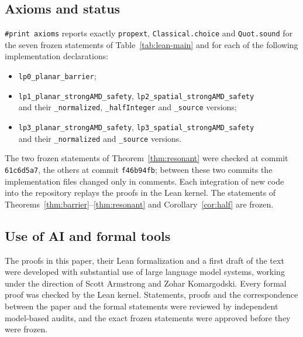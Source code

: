 \subsection{Axioms and status}

\texttt{\#print axioms} reports exactly \texttt{propext}, \texttt{Classical.choice} and \texttt{Quot.sound} for
the seven frozen statements of Table~\ref{tab:lean-main} and for each of the following implementation
declarations:
\begin{itemize}
\item \texttt{lp0\_planar\_barrier};
\item \texttt{lp1\_planar\_strongAMD\_safety}, \texttt{lp2\_spatial\_strongAMD\_safety}\\ and their
  \texttt{\_normalized}, \texttt{\_halfInteger} and \texttt{\_source} versions;
\item \texttt{lp3\_planar\_strongAMD\_safety}, \texttt{lp3\_spatial\_strongAMD\_safety}\\ and their
  \texttt{\_normalized} and \texttt{\_source} versions.
\end{itemize}
The two frozen statements of Theorem~\ref{thm:resonant} were checked at commit \texttt{61c6d5a7}, the others
at commit \texttt{f46b94fb}; between these two commits the implementation files changed only in comments. Each
integration of new code into the repository replays the proofs in the Lean kernel. The statements of
Theorems~\ref{thm:barrier}--\ref{thm:resonant} and Corollary~\ref{cor:half} are frozen.


\subsection{Use of AI and formal tools}

The proofs in this paper, their Lean formalization and a first draft of the text were developed with
substantial use of large language model systems, working under the direction of Scott Armstrong and Zohar
Komargodski. Every formal proof
was checked by the Lean kernel. Statements, proofs and the correspondence between the paper and the formal
statements were reviewed by independent model-based audits, and the exact frozen statements were approved before
they were frozen.
